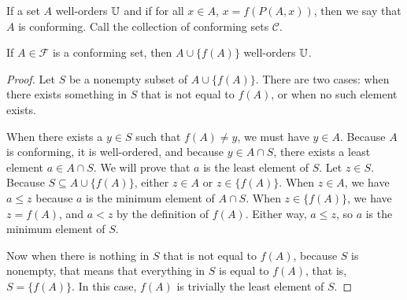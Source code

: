 \documentclass[../math.tex]{subfiles}
\begin{document}
\begin{definition}
    If a set $A$ well-orders $\mathbb{U}$ and if for all $x \in A$, $x = f(P(A, x))$,
    then we say that $A$ is conforming.  Call the collection of conforming sets
    $\mathcal C$.
\end{definition}

\begin{lemma} \label{conforming-add-wo}
    If $A \in \mathcal F$ is a conforming set, then $A \cup \{f(A)\}$
    well-orders $\mathbb{U}$.
\end{lemma}
\begin{proof}
    Let $S$ be a nonempty subset of $A \cup \{f(A)\}$.  There are two cases:
    when there exists something in $S$ that is not equal to $f(A)$, or when no
    such element exists.

    When there exists a $y \in S$ such that $f(A) \neq y$, we must have $y \in
    A$.  Because $A$ is conforming, it is well-ordered, and because $y \in A
    \cap S$, there exists a least element $a \in A \cap S$.  We will prove that
    $a$ is the least element of $S$.  Let $z \in S$.  Because $S \subseteq A
    \cup \{f(A)\}$, either $z \in A$ or $z \in \{f(A)\}$.  When $z \in A$, we
    have $a \leq z$ because $a$ is the minimum element of $A \cap S$.  When $z
    \in \{f(A)\}$, we have $z = f(A)$, and $a < z$ by the definition of $f(A)$.
    Either way, $a \leq z$, so $a$ is the minimum element of $S$.

    Now when there is nothing in $S$ that is not equal to $f(A)$, because $S$ is
    nonempty, that means that everything in $S$ is equal to $f(A)$, that is, $S
    = \{f(A)\}$.  In this case, $f(A)$ is trivially the least element of $S$.
\end{proof}
\end{document}

